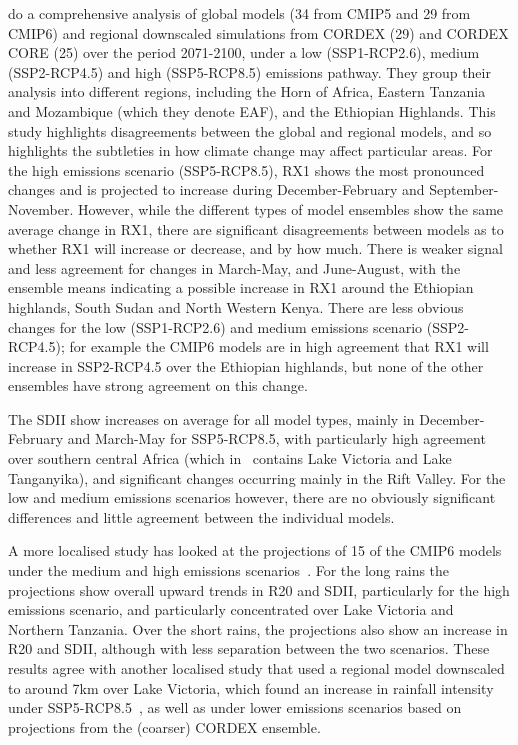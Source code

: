 \documentclass[../main.tex]{subfiles}
\begin{document}
\cite{dosio_projected_2021} do a comprehensive analysis of global models (34 from CMIP5 and 29 from CMIP6) and regional downscaled simulations from CORDEX (29) and CORDEX CORE (25) over the period 2071-2100, under a low (SSP1-RCP2.6), medium (SSP2-RCP4.5) and high (SSP5-RCP8.5) emissions pathway. They group their analysis into different regions, including the Horn of Africa, Eastern Tanzania and Mozambique (which they denote EAF), and the Ethiopian Highlands. This study highlights disagreements between the global and regional models, and so highlights the subtleties in how climate change may affect particular areas. For the high emissions scenario (SSP5-RCP8.5), RX1 shows the most pronounced changes and is projected to increase during December-February and September-November. However, while the different types of model ensembles show the same average change in RX1, there are significant disagreements between models as to whether RX1 will increase or decrease, and by how much. There is weaker signal and less agreement for changes in March-May, and June-August, with the ensemble means indicating a possible increase in RX1 around the Ethiopian highlands, South Sudan and North Western Kenya. There are less obvious changes for the low (SSP1-RCP2.6) and medium emissions scenario (SSP2-RCP4.5); for example the CMIP6 models are in high agreement that RX1 will increase in SSP2-RCP4.5 over the Ethiopian highlands, but none of the other ensembles have strong agreement on this change. 

The SDII show increases on average for all model types, mainly in December-February and March-May for SSP5-RCP8.5, with particularly high agreement over southern central Africa (which in~\cite{dosio_projected_2021} contains Lake Victoria and Lake Tanganyika), and significant changes occurring mainly in the Rift Valley. For the low and medium emissions scenarios however, there are no obviously significant differences and little agreement between the individual models.


A more localised study has looked at the projections of 15 of the CMIP6 models under the medium and high emissions scenarios~\citep{ayugi_future_2021}. For the long rains the projections show overall upward trends in R20 and SDII, particularly for the high emissions scenario, and particularly concentrated over Lake Victoria and Northern Tanzania. Over the short rains, the projections also show an increase in R20 and SDII, although with less separation between the two scenarios. These results agree with another localised study that used a regional model downscaled to around 7km over Lake Victoria, which found an increase in rainfall intensity under SSP5-RCP8.5~\citep{thiery_hazardous_2016}, as well as under lower emissions scenarios based on projections from the (coarser) CORDEX ensemble.
\end{document}
